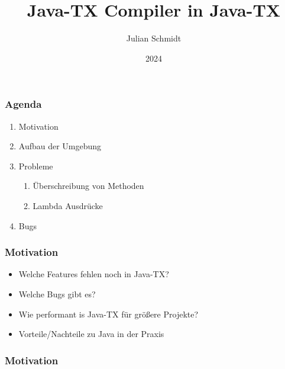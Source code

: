 \documentclass{beamer}
\title{Java-TX Compiler in Java-TX}
\author{Julian Schmidt}
\institute{DHBW Stuttgart}
\date{2024}
\begin{document}
\maketitle

\begin{frame}
    \frametitle{Agenda}
    \begin{enumerate}
        \item Motivation
        \item Aufbau der Umgebung
        \item Probleme
              \begin{enumerate}
                  \item Überschreibung von Methoden
                  \item Lambda Ausdrücke
              \end{enumerate}
        \item Bugs
    \end{enumerate}
\end{frame}

\begin{frame}
    \frametitle{Motivation}

    \begin{itemize}
        \item Welche Features fehlen noch in Java-TX?
        \item Welche Bugs gibt es?
        \item Wie performant is Java-TX für größere Projekte?
        \item Vorteile/Nachteile zu Java in der Praxis
    \end{itemize}

\end{frame}

\begin{frame}
    \frametitle{Motivation}
    \begin{center}
    \end{center}
\end{frame}
\end{document}
